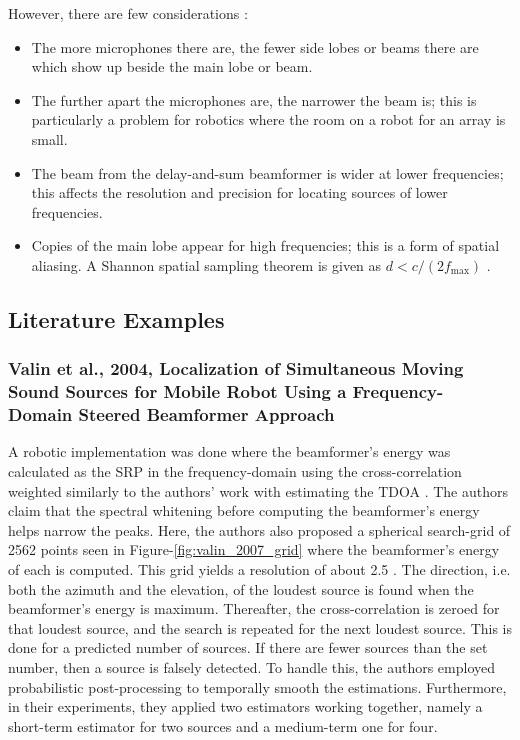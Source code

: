 \documentclass[notitlepage]{report}
\begin{document}
However, there are few considerations \cite{argentieri_survey_2015}:
\begin{itemize}
	\item The more microphones there are, the fewer side lobes or beams there are which show up beside the main lobe or beam.
	\item The further apart the microphones are, the narrower the beam is; this is particularly a problem for robotics where the room on a robot for an array is small.
	\item The beam from the delay-and-sum beamformer is wider at lower frequencies; this affects the resolution and precision for locating sources of lower frequencies.
	\item Copies of the main lobe appear for high frequencies; this is a form of spatial aliasing. A Shannon spatial sampling theorem is given as $d<c/(2f_{\text{max}})$ \cite{argentieri_survey_2015}.
\end{itemize}



\subsection{Literature Examples}

\subsubsection{Valin et al., 2004, Localization of Simultaneous Moving Sound Sources for Mobile Robot Using a Frequency- Domain Steered Beamformer Approach}

A robotic implementation \cite{valin_localization_2004} was done where the beamformer's energy was calculated as the SRP in the frequency-domain using the cross-correlation weighted similarly to the authors' work with estimating the TDOA \cite{valin_robust_2003}. The authors claim that the spectral whitening before computing the beamformer's energy helps narrow the peaks. Here, the authors also proposed a spherical search-grid of 2562 points seen in Figure-\ref{fig:valin_2007_grid} where the beamformer's energy of each is computed. This grid yields a resolution of about 2.5 \si{\deg}. The direction, i.e. both the azimuth and the elevation, of the loudest source is found when the beamformer's energy is maximum. Thereafter, the cross-correlation is zeroed for that loudest source, and the search is repeated for the next loudest source. This is done for a predicted number of sources. If there are fewer sources than the set number, then a source is falsely detected. To handle this, the authors employed probabilistic post-processing to temporally smooth the estimations. Furthermore, in their experiments, they applied two estimators working together, namely a short-term estimator for two sources and a medium-term one for four. 
\end{document}
